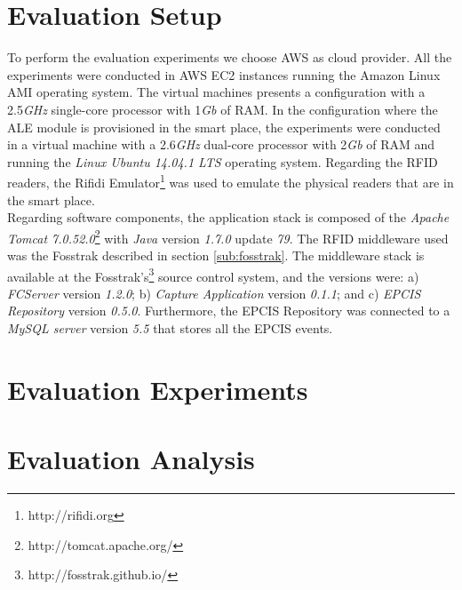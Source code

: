 \section{Evaluation Setup}
\label{sec:eval_setup}
To perform the evaluation experiments we choose \gls{AWS} as cloud provider. All the experiments were
conducted in \gls{AWS} \gls{EC2} instances running the Amazon Linux AMI operating system. The virtual
machines presents a configuration with a 2.5\textit{GHz} single-core processor with 1\textit{Gb} of
RAM. In the configuration where the \gls{ALE} module is provisioned in the smart place, the experiments
were conducted in a virtual machine with a 2.6\textit{GHz} dual-core processor with 2\textit{Gb} of
RAM and running the \textit{Linux Ubuntu 14.04.1 LTS} operating system. Regarding the \gls{RFID}
readers, the Rifidi Emulator\footnote{http://rifidi.org} was used to emulate the physical readers
that are in the smart place.\\

Regarding software components, the application stack is composed of the \textit{Apache Tomcat 7.0.52.0}\footnote{http://tomcat.apache.org/}
with \textit{Java} version \textit{1.7.0} update \textit{79}. The \gls{RFID} middleware used was the Fosstrak
described in section \ref{sub:fosstrak}. The middleware stack is available at the Fosstrak’s\footnote{http://fosstrak.github.io/}
source control system, and the versions were: a) \textit{FCServer} version \textit{1.2.0}; b) \textit{Capture Application}
version \textit{0.1.1}; and c) \textit{\gls{EPCIS} Repository} version \textit{0.5.0}. Furthermore,
the \gls{EPCIS} Repository was connected to a \textit{MySQL server} version \textit{5.5} that stores
all the \gls{EPCIS} events.

\section{Evaluation Experiments}
\label{sec:eval_experiments}

\section{Evaluation Analysis}
\label{sec:eval_analysis}
